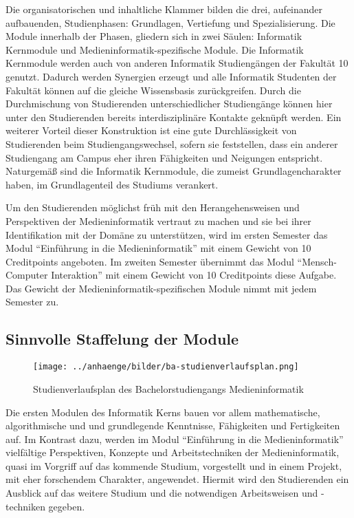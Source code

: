 Die organisatorischen und inhaltliche Klammer bilden die drei,
aufeinander aufbauenden, Studienphasen: Grundlagen, Vertiefung und
Spezialisierung. Die Module innerhalb der Phasen, gliedern sich in zwei
Säulen: Informatik Kernmodule und Medieninformatik-spezifische Module.
Die Informatik Kernmodule werden auch von anderen Informatik
Studiengängen der Fakultät 10 genutzt. Dadurch werden Synergien erzeugt
und alle Informatik Studenten der Fakultät können auf die gleiche
Wissensbasis zurückgreifen. Durch die Durchmischung von Studierenden
unterschiedlicher Studiengänge können hier unter den Studierenden
bereits interdisziplinäre Kontakte geknüpft werden. Ein weiterer Vorteil
dieser Konstruktion ist eine gute Durchlässigkeit von Studierenden beim
Studiengangswechsel, sofern sie feststellen, dass ein anderer
Studiengang am Campus eher ihren Fähigkeiten und Neigungen entspricht.
Naturgemäß sind die Informatik Kernmodule, die zumeist
Grundlagencharakter haben, im Grundlagenteil des Studiums verankert.

Um den Studierenden möglichst früh mit den Herangehensweisen und
Perspektiven der Medieninformatik vertraut zu machen und sie bei ihrer
Identifikation mit der Domäne zu unterstützen, wird im ersten Semester
das Modul ``Einführung in die Medieninformatik'' mit einem Gewicht von
10 Creditpoints angeboten. Im zweiten Semester übernimmt das Modul
``Mensch-Computer Interaktion'' mit einem Gewicht von 10 Creditpoints
diese Aufgabe. Das Gewicht der Medieninformatik-spezifischen Module
nimmt mit jedem Semester zu.

\subsection{Sinnvolle Staffelung der
Module\label{/mi-2017/selbstbericht/0400-studiengangskonzept/0000-studiengangskonzept}}\label{sinnvolle-staffelung-der-modulepathlabelmi-2017selbstbericht0400-studiengangskonzept0000-studiengangskonzept}

\begin{figure}[htbp]
\centering
\texttt{[image: ../anhaenge/bilder/ba-studienverlaufsplan.png]}
\caption{Studienverlaufsplan des Bachelorstudiengangs Medieninformatik}
\end{figure}

Die ersten Modulen des Informatik Kerns bauen vor allem mathematische,
algorithmische und und grundlegende Kenntnisse, Fähigkeiten und
Fertigkeiten auf. Im Kontrast dazu, werden im Modul ``Einführung in die
Medieninformatik'' vielfältige Perspektiven, Konzepte und
Arbeitstechniken der Medieninformatik, quasi im Vorgriff auf das
kommende Studium, vorgestellt und in einem Projekt, mit eher forschendem
Charakter, angewendet. Hiermit wird den Studierenden ein Ausblick auf
das weitere Studium und die notwendigen Arbeitsweisen und -techniken
gegeben.


